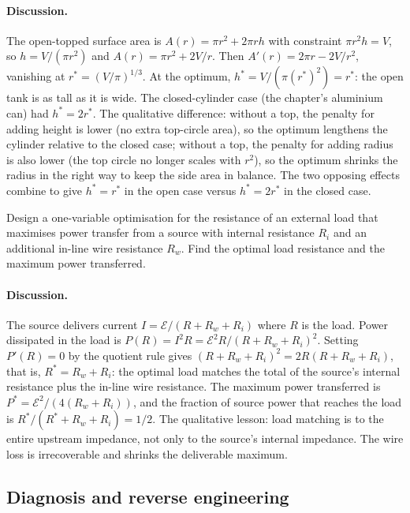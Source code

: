 \paragraph{Discussion.}
The open-topped surface area is $A(r) = \pi r^{2} + 2 \pi r h$
with constraint $\pi r^{2} h = V$, so $h = V/(\pi r^{2})$ and
$A(r) = \pi r^{2} + 2 V / r$. Then $A'(r) = 2 \pi r - 2 V / r^{2}$,
vanishing at $r^{*} = (V/\pi)^{1/3}$. At the optimum, $h^{*} =
V/(\pi (r^{*})^{2}) = r^{*}$: the open tank is as tall as it is
wide. The closed-cylinder case (the chapter's aluminium can) had
$h^{*} = 2 r^{*}$. The qualitative difference: without a top, the
penalty for adding height is lower (no extra top-circle area), so
the optimum lengthens the cylinder relative to the closed case;
without a top, the penalty for adding radius is also lower
(the top circle no longer scales with $r^{2}$), so the optimum
shrinks the radius in the right way to keep the side area in
balance. The two opposing effects combine to give $h^{*} = r^{*}$
in the open case versus $h^{*} = 2 r^{*}$ in the closed case.

\begin{exercise}
Design a one-variable optimisation for the resistance of an
external load that maximises power transfer from a source with
internal resistance $R_{i}$ and an additional in-line wire
resistance $R_{w}$. Find the optimal load resistance and the
maximum power transferred.
\end{exercise}

\paragraph{Discussion.}
The source delivers current $I = \mathcal{E} / (R + R_{w} + R_{i})$
where $R$ is the load. Power dissipated in the load is
$P(R) = I^{2} R = \mathcal{E}^{2} R / (R + R_{w} + R_{i})^{2}$.
Setting $P'(R) = 0$ by the quotient rule gives $(R + R_{w} +
R_{i})^{2} = 2 R (R + R_{w} + R_{i})$, that is, $R^{*} = R_{w} +
R_{i}$: the optimal load matches the total of the source's
internal resistance plus the in-line wire resistance. The
maximum power transferred is $P^{*} = \mathcal{E}^{2} /
(4 (R_{w} + R_{i}))$, and the fraction of source power that
reaches the load is $R^{*} / (R^{*} + R_{w} + R_{i}) = 1/2$.
The qualitative lesson: load matching is to the entire upstream
impedance, not only to the source's internal impedance. The wire
loss is irrecoverable and shrinks the deliverable maximum.

\subsection*{Diagnosis and reverse engineering}


